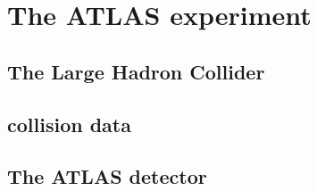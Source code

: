 
\chapter{The ATLAS experiment}
\label{chap:experiment}

\section{The Large Hadron Collider}
	\label{sec:lhc}
	
\section{\pp collision data}
	\label{sec:dataset}
	
\clearpage
\section{The ATLAS detector}
	\label{sec:atlas}
	




